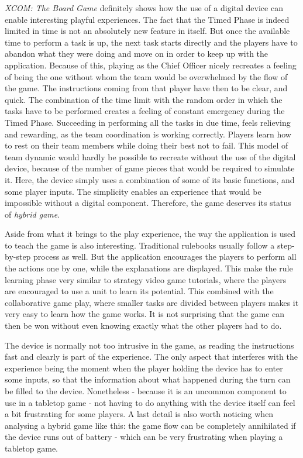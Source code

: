 \textit{XCOM: The Board Game} definitely shows how the use of a digital device can enable interesting playful experiences. The fact that the Timed Phase is indeed limited in time is not an absolutely new feature in itself. But once the available time to perform a task is up, the next task starts directly and the players have to abandon what they were doing and move on in order to keep up with the application. Because of this, playing as the Chief Officer nicely recreates a feeling of being the one without whom the team would be overwhelmed by the flow of the game. The instructions coming from that player have then to be clear, and quick. The combination of the time limit with the random order in which the tasks have to be performed creates a feeling of constant emergency during the Timed Phase. Succeeding in performing all the tasks in due time, feels relieving and rewarding, as the team coordination is working correctly. Players learn how to rest on their team members while doing their best not to fail. This model of team dynamic would hardly be possible to recreate without the use of the digital device, because of the number of game pieces that would be required to simulate it. Here, the device simply uses a combination of some of its basic functions, and some player inputs. The simplicity enables an experience that would be impossible without a digital component. Therefore, the game deserves its status of \textit{hybrid game}.

Aside from what it brings to the play experience, the way the application is used to teach the game is also interesting. Traditional rulebooks usually follow a step-by-step process as well. But the application encourages the players to perform all the actions one by one, while the explanations are displayed. This make the rule learning phase very similar to strategy video game tutorials, where the players are encouraged to use a unit to learn its potential. This combined with the collaborative game play, where smaller tasks are divided between players makes it very easy to learn how the game works. It is not surprising that the game can then be won without even knowing exactly what the other players had to do.

The device is normally not too intrusive in the game, as reading the instructions fast and clearly is part of the experience. The only aspect that interferes with the experience being the moment when the player holding the device has to enter some inputs, so that the information about what happened during the turn can be filled to the device. Nonetheless - because it is an uncommon component to use in a tabletop game - not having to do anything with the device itself can feel a bit frustrating for some players. A last detail is also worth noticing when analysing a hybrid game like this: the game flow can be completely annihilated if the device runs out of battery - which can be very frustrating when playing a tabletop game. 
